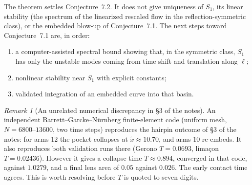 \documentclass[11pt]{amsart}
\theoremstyle{remark}
\newtheorem{remark}[theorem]{Remark}
\begin{document}
The theorem settles Conjecture~7.2. It does not give uniqueness of $S_1$, its linear stability (the spectrum of the linearized rescaled flow in the reflection-symmetric class), or the embedded blow-up of Conjecture~7.1. The next steps toward Conjecture~7.1 are, in order:
\begin{enumerate}
\item a computer-assisted spectral bound showing that, in the symmetric class, $S_1$ has only the unstable modes coming from time shift and translation along $\ell$;
\item nonlinear stability near $S_1$ with explicit constants;
\item validated integration of an embedded curve into that basin.
\end{enumerate}

\begin{remark}[An unrelated numerical discrepancy in \S3 of the notes]
An independent Barrett--Garcke--N\"urnberg finite-element code (uniform mesh, $N=6800$--$13600$, two time steps) reproduces the hairpin outcome of \S3 of the notes: for arms $12$ the pocket collapses at $\tilde x\approx10.70$, and arms $10$ re-embeds. It also reproduces both validation runs there (Gerono $T=0.0693$, lima\c{c}on $T=0.02436$). However it gives a collapse time $T\approx0.894$, converged in that code, against $1.0279$, and a final lens area of $0.05$ against $0.026$. The early contact time agrees. This is worth resolving before $T$ is quoted to seven digits.
\end{remark}
\end{document}
